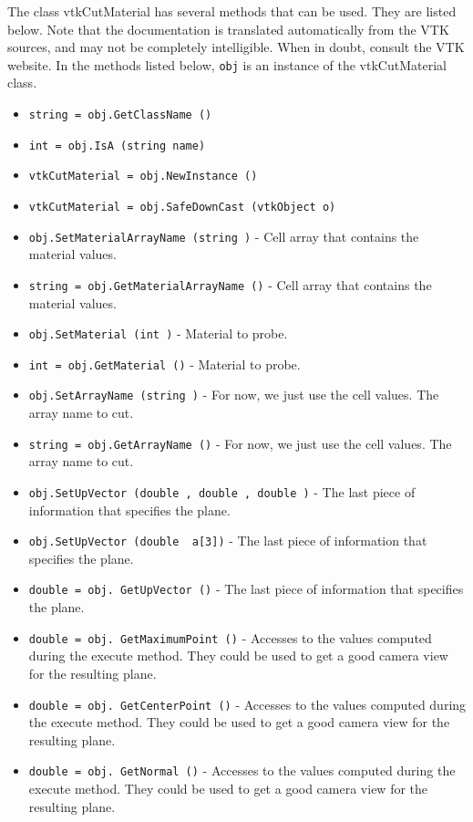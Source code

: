The class vtkCutMaterial has several methods that can be used.
  They are listed below.
Note that the documentation is translated automatically from the VTK sources,
and may not be completely intelligible.  When in doubt, consult the VTK website.
In the methods listed below, \verb|obj| is an instance of the vtkCutMaterial class.
\begin{itemize}
\item  \verb|string = obj.GetClassName ()|

\item  \verb|int = obj.IsA (string name)|

\item  \verb|vtkCutMaterial = obj.NewInstance ()|

\item  \verb|vtkCutMaterial = obj.SafeDownCast (vtkObject o)|

\item  \verb|obj.SetMaterialArrayName (string )| -  Cell array that contains the material values.

\item  \verb|string = obj.GetMaterialArrayName ()| -  Cell array that contains the material values.

\item  \verb|obj.SetMaterial (int )| -  Material to probe.

\item  \verb|int = obj.GetMaterial ()| -  Material to probe.

\item  \verb|obj.SetArrayName (string )| -  For now, we just use the cell values.
 The array name to cut.

\item  \verb|string = obj.GetArrayName ()| -  For now, we just use the cell values.
 The array name to cut.

\item  \verb|obj.SetUpVector (double , double , double )| -  The last piece of information that specifies the plane.

\item  \verb|obj.SetUpVector (double  a[3])| -  The last piece of information that specifies the plane.

\item  \verb|double = obj. GetUpVector ()| -  The last piece of information that specifies the plane.

\item  \verb|double = obj. GetMaximumPoint ()| -  Accesses to the values computed during the execute method.  They
 could be used to get a good camera view for the resulting plane.

\item  \verb|double = obj. GetCenterPoint ()| -  Accesses to the values computed during the execute method.  They
 could be used to get a good camera view for the resulting plane.

\item  \verb|double = obj. GetNormal ()| -  Accesses to the values computed during the execute method.  They
 could be used to get a good camera view for the resulting plane.

\end{itemize}
